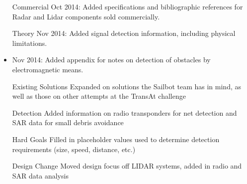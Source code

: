 \begin{itemize}
\item[Commercial] Oct 2014: Added specifications and bibliographic references for Radar and Lidar components sold commercially.
\item[Theory] Nov 2014: Added signal detection information, including physical limitations.
\item Nov 2014: Added appendix for notes on detection of obstacles by electromagnetic means.
\item[Existing Solutions] Expanded on solutions the Sailbot team has in mind, as well as those on other attempts at the TransAt challenge
\item[Detection] Added information on radio transponders for net detection and SAR data for small debris avoidance
\item[Hard Goals] Filled in placeholder values used to determine detection requirements (size, speed, distance, etc.)
\item[Design Change] Moved design focus off LIDAR systems, added in radio and SAR data analysis
\end{itemize}